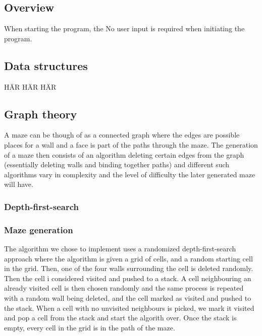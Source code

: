 \documentclass[12pt, a4paper]{article}
\begin{document}
\subsection{Overview}
When starting the program, the 
No user input is required when initiating the program.

\subsection{Data structures}
HÄR HÄR HÄR 

\subsection{Graph theory}
A maze can be though of as a connected graph where the edges are possible places for a wall and a face is part of the paths through the maze. The generation of a maze then consists of an algorithm deleting certain edges from the graph (essentially deleting walls and binding together paths) and different such algorithms vary in complexity and the level of difficulty the later generated maze will have. 


\subsubsection{Depth-first-search}


\subsubsection{Maze generation}
The algorithm we chose to implement uses a randomized depth-first-search approach where the algorithm is given a grid of cells, and a random starting cell in the grid. Then, one of the four walls surrounding the cell is deleted randomly. Then the cell i considered visited and pushed to a stack. A cell neighbouring an already visited cell is then chosen randomly and the same process is repeated with a random wall being deleted, and the cell marked as visited and pushed to the stack. When a cell with no unvisited neighbours is picked, we mark it visited and pop a cell from the stack and start the algorith over. Once the stack is empty, every cell in the grid is in the path of the maze. 



    
\end{document}
